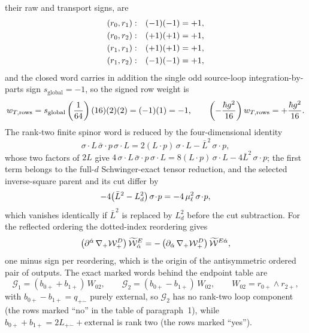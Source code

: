 their raw and transport signs, are
\begin{align}
(r_0,r_1):&\quad (-1)(-1)=+1,\notag\\
(r_0,r_2):&\quad (+1)(+1)=+1,\label{eq:ss:seedsigntable}\\
(r_1,r_1):&\quad (+1)(+1)=+1,\notag\\
(r_1,r_2):&\quad (-1)(-1)=+1,\notag
\end{align}
and the closed word carries in addition the single odd source-loop
integration-by-parts sign $s_{\mathrm{global}}=-1$, so the signed row weight
is
\begin{equation}\label{eq:ss:seedrowsign}
w_{T,\mathrm{rows}}
=s_{\mathrm{global}}\left(\frac{1}{64}\right)(16)(2)(2)=(-1)(1)=-1,
\qquad
\left(-\frac{\hbar g^{2}}{16}\right)w_{T,\mathrm{rows}}=+\frac{\hbar g^{2}}{16}.
\end{equation}
The rank-two finite spinor word is reduced by the four-dimensional identity
\begin{equation}\label{eq:ss:seedfierz}
\sigma\!\cdot\!L\,\bar\sigma\!\cdot\!p\,\sigma\!\cdot\!L
=2(L\!\cdot\!p)\,\sigma\!\cdot\!L-\bar L^{2}\,\sigma\!\cdot\!p ,
\end{equation}
whose two factors of $2L$ give
$4\,\sigma\!\cdot\!L\,\bar\sigma\!\cdot\!p\,\sigma\!\cdot\!L
=8(L\!\cdot\!p)\,\sigma\!\cdot\!L-4\bar L^{2}\,\sigma\!\cdot\!p$; the first
term belongs to the full-$d$ Schwinger-exact tensor reduction, and the
selected inverse-square parent and its cut differ by
\begin{equation}\label{eq:ss:seedsigmafour}
-4\big(\bar L^{2}-L_d^{2}\big)\,\sigma\!\cdot\!p
=-4\,\mu_\ell^{2}\,\sigma\!\cdot\!p ,
\end{equation}
which vanishes identically if $\bar L^{2}$ is replaced by $L_d^{2}$ before
the cut subtraction. For the reflected ordering the dotted-index reordering
gives
\begin{equation}\label{eq:ss:seedreflect}
\big(\partial^{\dot\alpha}\,\nabla_{+}\mathcal{W}_{+}^{D}\big)\,\widetilde{\mathcal{W}}_{\dot\alpha}^{E}
=-\,\big(\partial_{\dot\alpha}\,\nabla_{+}\mathcal{W}_{+}^{D}\big)\,
\widetilde{\mathcal{W}}^{E\dot\alpha},
\end{equation}
one minus sign per reordering, which is the origin of the antisymmetric
ordered pair of outputs. The exact marked words behind the endpoint table
are
\begin{equation}\label{eq:ss:seedGwords}
\mathcal G_1=(b_{0+}+b_{1+})\,W_{02},
\qquad
\mathcal G_2=(b_{0+}-b_{1+})\,W_{02},
\qquad
W_{02}=r_{0+}\wedge r_{2+},
\end{equation}
with $b_{0+}-b_{1+}=q_{+\dot-}$ purely external, so $\mathcal G_2$ has no
rank-two loop component (the rows marked ``no'' in the table of
paragraph~1), while $b_{0+}+b_{1+}=2L_{+\dot-}+\text{external}$ is rank two
(the rows marked ``yes'').

